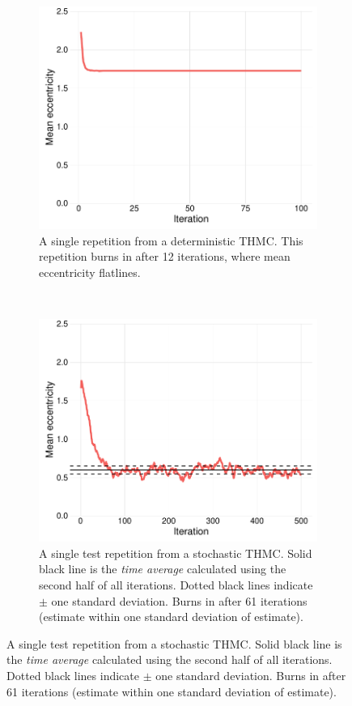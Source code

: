 \documentclass[preprint, 12pt]{elsarticle}
\begin{document}
\begin{figure}[hb!]
	\caption{Example of trace plots.}
	\centering
	\begin{subfigure}[t]{0.485\textwidth}
		\includegraphics[width=\textwidth]{Graphics/figb21a.pdf}
		\caption{A single repetition from a deterministic THMC. This repetition burns in after 12 iterations, where mean eccentricity flatlines.}
		\label{fig:deterministic}
	\end{subfigure}
	~
	\begin{subfigure}[t]{0.485\textwidth}
		\includegraphics[width=\textwidth]{Graphics/figb22a.pdf}
		\caption{A single test repetition from a stochastic THMC. Solid black line is the \emph{time average} calculated using the second half of all iterations. Dotted black lines indicate $\pm$ one standard deviation. Burns in after 61 iterations (estimate within one standard deviation of estimate).}
		\label{fig:stochastic}
	\end{subfigure}
	\label{fig:traceplots}
\end{figure}
\end{document}
